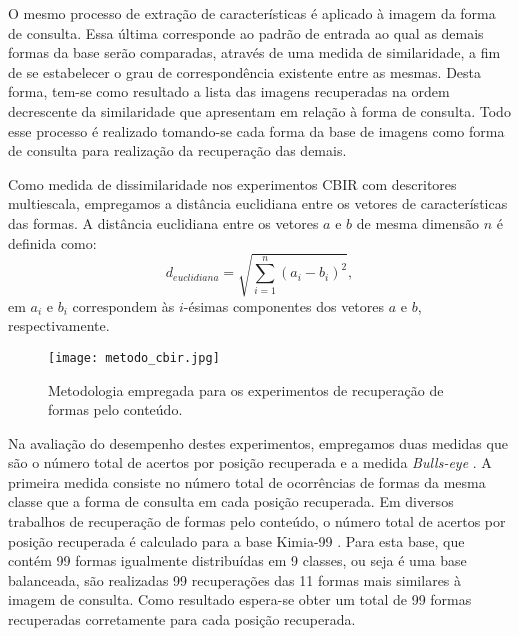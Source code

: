 O mesmo processo de extração de características é aplicado à imagem da forma de consulta. Essa última corresponde ao padrão de entrada ao qual as demais formas da base serão comparadas, através de uma medida de similaridade, a fim de se estabelecer o grau de correspondência existente entre as mesmas. Desta forma, tem-se como resultado a lista das imagens recuperadas na ordem decrescente da similaridade que apresentam em relação à forma de consulta. Todo esse processo é realizado tomando-se cada forma da base de imagens como forma de consulta para realização da recuperação das demais.

Como medida de dissimilaridade nos experimentos \ac{CBIR} com descritores multiescala, empregamos a distância  euclidiana entre os vetores de características das formas. A distância euclidiana entre os vetores $a$ e $b$ de mesma dimensão $n$ é definida como: %
\begin{equation}
\label{eq:dist_euclidiana}
{d}_{euclidiana} = \sqrt{\sum_{i=1}^{n}{({a}_{i}-{b}_{i})}^{2}},
\end{equation}
em ${a}_{i}$ e ${b}_{i}$ correspondem às $i$-ésimas componentes dos vetores $a$ e $b$, respectivamente.


\begin{figure}[h!]
\caption{\label{fig:metodo_cbir} Metodologia empregada para os experimentos de recuperação de formas pelo conteúdo.}
  \centering
  \texttt{[image: metodo\_cbir.jpg]}
\end{figure}



Na avaliação do desempenho destes experimentos, empregamos duas medidas que são  o número total de acertos por posição recuperada e a medida \textit{Bulls-eye} \cite{Ling:2007:SCU:1191552.1191806,Latecki2000}.
A primeira medida consiste no número total de ocorrências de formas da mesma classe que a forma de consulta em cada posição recuperada.  Em diversos trabalhos de recuperação de formas pelo conteúdo, o número total de acertos por posição recuperada é calculado para a base Kimia-99 \cite{Bernier:2003}. Para esta base, que contém 99 formas igualmente distribuídas em 9 classes, ou seja é uma base balanceada, são realizadas 99 recuperações das 11 formas mais similares à imagem de consulta. Como resultado espera-se obter um total de 99 formas recuperadas corretamente para cada posição recuperada.

